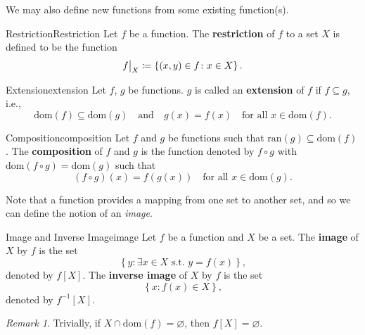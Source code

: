 \documentclass[math]{amznotes}
\theoremstyle{remark}
\newtheorem*{remark}{Remark}
\begin{document}
We may also define new functions from some existing function(s).
\begin{dfnbox}{Restriction}{Restriction}
    Let $f$ be a function. The {\color{red} \textbf{restriction}} of $f$ to a set $X$ is defined to be the function  
    \begin{displaymath}
        \restrict{f}{X} \coloneqq \left\{(x, y) \in f \colon x \in X\right\}.
    \end{displaymath}
\end{dfnbox}
\begin{dfnbox}{Extension}{extension}
    Let $f$, $g$ be functions. $g$ is called an {\color{red} \textbf{extension}} of $f$ if $f \subseteq g$, i.e.,
    \begin{displaymath}
        \mathrm{dom}(f) \subseteq \mathrm{dom}(g) \quad \textrm{and} \quad g(x) = f(x) \quad \textrm{for all } x \in \mathrm{dom}(f).
    \end{displaymath}
\end{dfnbox}
\begin{dfnbox}{Composition}{composition}
    Let $f$ and $g$ be functions such that $\mathrm{ran}(g) \subseteq \mathrm{dom}(f)$. The {\color{red} \textbf{composition}} of $f$ and $g$ is the function denoted by $f \circ g$ with $\mathrm{dom}(f \circ g) = \mathrm{dom}(g)$ such that
    \begin{displaymath}
        (f \circ g)(x) = f\left(g(x)\right) \quad \textrm{for all } x \in \mathrm{dom}(g).
    \end{displaymath}
\end{dfnbox}
Note that a function provides a mapping from one set to another set, and so we can define the notion of an \textit{image}.
\begin{dfnbox}{Image and Inverse Image}{image}
    Let $f$ be a function and $X$ be a set. The {\color{red} \textbf{image}} of $X$ by $f$ is the set
    \begin{displaymath}
        \left\{y \colon \exists x \in X \textrm{ s.t. } y = f(x)\right\},
    \end{displaymath}
    denoted by $f[X]$. The {\color{red} \textbf{inverse image}} of $X$ by $f$ is the set
    \begin{displaymath}
        \left\{x \colon f(x) \in X\right\},
    \end{displaymath}
    denoted by $f^{-1}[X]$.
\end{dfnbox}
\begin{notebox}
    \begin{remark}
        Trivially, if $X \cap \mathrm{dom}(f) = \varnothing$, then $f[X] = \varnothing$.
    \end{remark}
\end{notebox}
\end{document}
